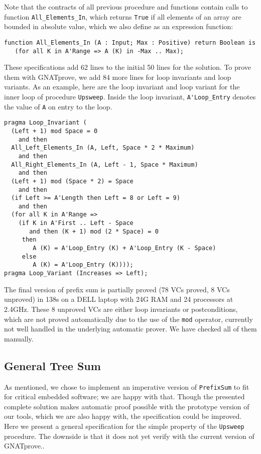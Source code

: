 \documentclass[sttt,draft]{svjour}
\newcommand{\gnatprove}{GNATprove\xspace}
\begin{document}
Note that the contracts of all previous procedure and functions contain calls
to function \verb|All_Elements_In|, which returns \verb|True| if all elements
of an array are bounded in absolute value, which we also define as an
expression function:

\begin{footnotesize}
\begin{verbatim}
function All_Elements_In (A : Input; Max : Positive) return Boolean is
   (for all K in A'Range => A (K) in -Max .. Max);
\end{verbatim}
\end{footnotesize}

These specifications add 62 lines to the initial 50 lines for the solution. To
prove them with \gnatprove, we add 84 more lines for loop invariants and loop
variants. As an example, here are the loop invariant and loop variant for the
inner loop of procedure \verb|Upsweep|. Inside the loop invariant,
\verb|A'Loop_Entry| denotes the value of \verb|A| on entry to the loop.

\begin{footnotesize}
\begin{verbatim}
pragma Loop_Invariant (
  (Left + 1) mod Space = 0
    and then
  All_Left_Elements_In (A, Left, Space * 2 * Maximum)
    and then
  All_Right_Elements_In (A, Left - 1, Space * Maximum)
    and then
  (Left + 1) mod (Space * 2) = Space
    and then
  (if Left >= A'Length then Left = 8 or Left = 9)
    and then
  (for all K in A'Range =>
    (if K in A'First .. Left - Space
       and then (K + 1) mod (2 * Space) = 0
     then
        A (K) = A'Loop_Entry (K) + A'Loop_Entry (K - Space)
     else
        A (K) = A'Loop_Entry (K))));
pragma Loop_Variant (Increases => Left);
\end{verbatim}
\end{footnotesize}

The final version of prefix sum is partially proved (78 VCs proved, 8 VCs
unproved) in 138s on a DELL laptop with 24G RAM and 24 processors at 2.4GHz.
These 8 unproved VCs are either loop invariants or postconditions, which are
not proved automatically due to the use of the \verb|mod| operator, currently
not well handled in the underlying automatic prover. We have checked all of
them manually.

\subsection{General  Tree Sum}
As mentioned, we chose to implement an imperative version of
\verb|PrefixSum| to fit for critical embedded software; we are happy
with that. Though the presented complete solution makes automatic
proof possible with the prototype version of our tools, which we are
also happy with, the specification could be improved. Here we present
a general specification for the simple property of the \verb|Upsweep|
procedure.  The downside is that it does not yet verify with the
current version of \gnatprove..
\end{document}
